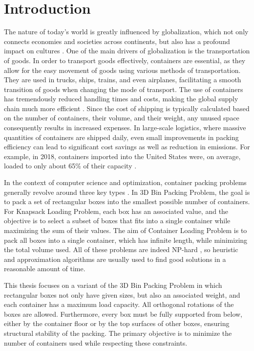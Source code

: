 \chapter*{Introduction}

The nature of today’s world is greatly influenced by globalization,  
which not only connects economies and societies across continents, 
but also has a profound impact on cultures \cite{zizek1997}.
One of the main drivers of globalization is the transportation of goods. 
In order to transport goods effectively, containers are essential, 
as they allow for the easy movement of goods using various methods of transportation. 
They are used in trucks, ships, trains, and even airplanes, 
facilitating a smooth transition of goods when changing the mode of transport. 
The use of containers has tremendously reduced handling times and costs, making the global supply chain much more efficient \cite{bernhofen2016}.
Since the cost of shipping is typically calculated based on the number of containers, their volume, and their weight, 
any unused space consequently results in increased expenses. 
In large-scale logistics, where massive quantities of containers are shipped daily, 
even small improvements in packing efficiency can lead to significant cost savings as well as reduction in emissions. 
For example, in 2018, containers imported into the United States were, on average, loaded to only about 65\% of their capacity \cite{obyrne2021}.

In the context of computer science and optimization, container packing problems generally revolve around three key types \cite{martello2000}.
In 3D Bin Packing Problem, the goal is to pack a set of rectangular boxes into the smallest possible number of containers.
For Knapsack Loading Problem, each box has an associated value, and the objective is to select a subset of boxes that fits into a single container while maximizing the sum of their values.
The aim of Container Loading Problem is to pack all boxes into a single container, which has infinite length, while minimizing the total volume used.
All of these problems are indeed NP-hard \cite{martello2000}, so heuristic and approximation algorithms are usually used to find good solutions in a reasonable amount of time.

This thesis focuses on a variant of the 3D Bin Packing Problem in which rectangular boxes not only have given sizes,
but also an associated weight, and each container has a maximum load capacity. All orthogonal rotations of the boxes are allowed.
Furthermore, every box must be fully supported from below, either by the container floor or by the top surfaces of other boxes, 
ensuring structural stability of the packing. 
The primary objective is to minimize the number of containers used while respecting these constraints.

